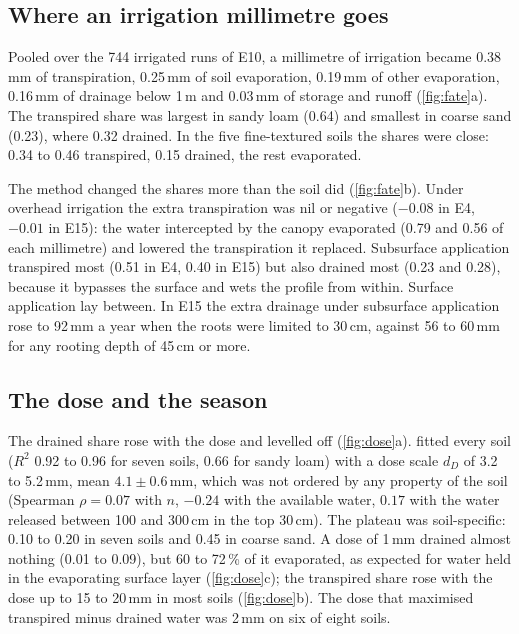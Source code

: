 \documentclass[review,12pt,authoryear]{elsarticle}
\begin{document}
\subsection{Where an irrigation millimetre goes}
Pooled over the 744 irrigated runs of E10, a millimetre of irrigation became 0.38\,mm of transpiration, 0.25\,mm of soil evaporation, 0.19\,mm of other evaporation, 0.16\,mm of drainage below 1\,m and 0.03\,mm of storage and runoff (\cref{fig:fate}a). The transpired share was largest in sandy loam (0.64) and smallest in coarse sand (0.23), where 0.32 drained. In the five fine-textured soils the shares were close: 0.34 to 0.46 transpired, 0.15 drained, the rest evaporated.

The method changed the shares more than the soil did (\cref{fig:fate}b). Under overhead irrigation the extra transpiration was nil or negative ($-0.08$ in E4, $-0.01$ in E15): the water intercepted by the canopy evaporated (0.79 and 0.56 of each millimetre) and lowered the transpiration it replaced. Subsurface application transpired most (0.51 in E4, 0.40 in E15) but also drained most (0.23 and 0.28), because it bypasses the surface and wets the profile from within. Surface application lay between. In E15 the extra drainage under subsurface application rose to 92\,mm a year when the roots were limited to 30\,cm, against 56 to 60\,mm for any rooting depth of 45\,cm or more.


\subsection{The dose and the season}
The drained share rose with the dose and levelled off (\cref{fig:dose}a).  fitted every soil ($R^2$ 0.92 to 0.96 for seven soils, 0.66 for sandy loam) with a dose scale $d_D$ of 3.2 to 5.2\,mm, mean $4.1\pm0.6$\,mm, which was not ordered by any property of the soil (Spearman $\rho=0.07$ with $n$, $-0.24$ with the available water, $0.17$ with the water released between 100 and 300\,cm in the top 30\,cm). The plateau was soil-specific: 0.10 to 0.20 in seven soils and 0.45 in coarse sand. A dose of 1\,mm drained almost nothing (0.01 to 0.09), but 60 to 72\,\% of it evaporated, as expected for water held in the evaporating surface layer \citep{Lehmann2008,Shokri2011,Or2013} (\cref{fig:dose}c); the transpired share rose with the dose up to 15 to 20\,mm in most soils (\cref{fig:dose}b). The dose that maximised transpired minus drained water was 2\,mm on six of eight soils.
\end{document}
